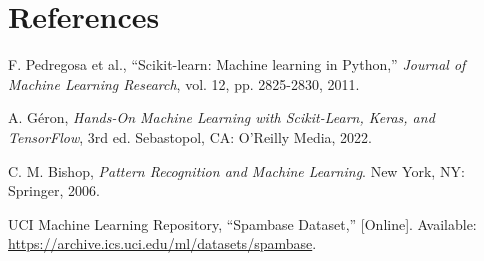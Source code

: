 \documentclass[12pt,a4paper]{article}
\begin{document}
\section{References}
\begin{enumerate}[label={[\arabic*]}]
\item F. Pedregosa et al., ``Scikit-learn: Machine learning in Python,'' \textit{Journal of Machine Learning Research}, vol. 12, pp. 2825-2830, 2011.
\item A. G\'eron, \textit{Hands-On Machine Learning with Scikit-Learn, Keras, and TensorFlow}, 3rd ed. Sebastopol, CA: O'Reilly Media, 2022.
\item C. M. Bishop, \textit{Pattern Recognition and Machine Learning}. New York, NY: Springer, 2006.
\item UCI Machine Learning Repository, ``Spambase Dataset,'' [Online]. Available: \url{https://archive.ics.uci.edu/ml/datasets/spambase}.
\end{enumerate}
\end{document}
